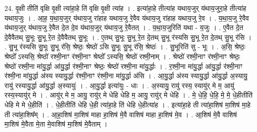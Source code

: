 \documentclass[17pt]{extarticle}
\begin{document}
24. वृ॒क्षी तीति॑ वृक्षि वृ॒क्षी त्या॑हा॒हे ति॑ वृक्षि वृ॒क्षी त्या॑ह । . इत्या॑हा॒हे तीत्या॑ह यथाय॒जुर् य॑थाय॒जुरा॒हे तीत्या॑ह यथाय॒जुः । . आ॒ह॒ य॒था॒य॒जुर् य॑थाय॒जु रा॑हाह यथाय॒जु रे॒वैव य॑थाय॒जु रा॑हाह यथाय॒जु रे॒व । . य॒था॒य॒जु रे॒वैव य॑थाय॒जुर् य॑थाय॒जु रे॒वैत दे॒त दे॒व य॑थाय॒जुर् य॑थाय॒जु रे॒वैतत् । . य॒था॒य॒जुरिति॑ यथा - य॒जुः । . ए॒वैत दे॒त दे॒वैवैतथ् सु॒भूः सु॒भू रे॒त दे॒वैवैतथ् सु॒भूः । . ए॒तथ् सु॒भूः सु॒भू रे॒त दे॒तथ् सु॒भू र॑स्यसि सु॒भू रे॒त दे॒तथ् सु॒भू र॑सि । . सु॒भू र॑स्यसि सु॒भूः सु॒भू र॑सि॒ श्रेष्ठः॒ श्रेष्ठो॑ ऽसि सु॒भूः सु॒भू र॑सि॒ श्रेष्ठः॑ । . सु॒भूरिति॑ सु - भूः । . अ॒सि॒ श्रेष्ठः॒ श्रेष्ठो᳚ ऽस्यसि॒ श्रेष्ठो॑ रश्मी॒नाꣳ र॑श्मी॒नाꣳ श्रेष्ठो᳚ ऽस्यसि॒ श्रेष्ठो॑ रश्मी॒नाम् । . श्रेष्ठो॑ रश्मी॒नाꣳ र॑श्मी॒नाꣳ श्रेष्ठः॒ श्रेष्ठो॑ रश्मी॒ना मा॑यु॒र्द्धा आ॑यु॒र्द्धा र॑श्मी॒नाꣳ श्रेष्ठः॒ श्रेष्ठो॑ रश्मी॒ना मा॑यु॒र्द्धाः । . र॒श्मी॒ना मा॑यु॒र्द्धा आ॑यु॒र्द्धा र॑श्मी॒नाꣳ र॑श्मी॒ना मा॑यु॒र्द्धा अ॑स्य स्यायु॒र्द्धा र॑श्मी॒नाꣳ र॑श्मी॒ना मा॑यु॒र्द्धा अ॑सि । . आ॒यु॒र्द्धा अ॑स्य स्यायु॒र्द्धा आ॑यु॒र्द्धा अ॒स्यायु॒ रायु॑ रस्यायु॒र्द्धा आ॑यु॒र्द्धा अ॒स्यायुः॑ । . आ॒यु॒र्द्धा इत्या॑युः - धाः । . अ॒स्यायु॒ रायु॑ रस्य॒ स्यायु॑र् मे म॒ आयु॑ रस्य॒स्यायु॑र् मे । . आयु॑र् मे म॒ आयु॒ रायु॑र् मे धेहि धेहि म॒ आयु॒ रायु॑र् मे धेहि । . मे॒ धे॒हि॒ धे॒हि॒ मे॒ मे॒ धे॒हीतीति॑ धेहि मे मे धे॒हीति॑ । . धे॒हीतीति॑ धेहि धे॒ही त्या॑हा॒हे ति॑ धेहि धे॒हीत्या॑ह । . इत्या॑हा॒हे ती त्या॑हा॒शिष॑ मा॒शिष॑ मा॒हे ती त्या॑हा॒शिष᳚म् । . आ॒हा॒शिष॑ मा॒शिष॑ माहा हा॒शिष॑ मे॒वै वाशिष॑ माहा हा॒शिष॑ मे॒व । . आ॒शिष॑ मे॒वै वाशिष॑ मा॒शिष॑ मे॒वैता मे॒ता मे॒वाशिष॑ मा॒शिष॑ मे॒वैताम् । \newline
\end{document}

